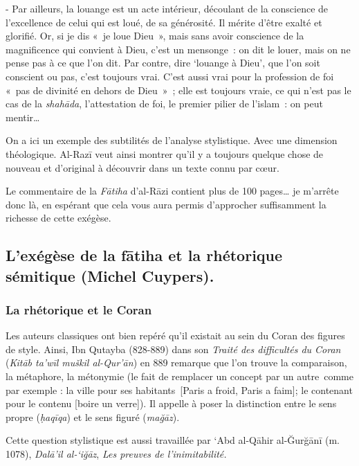 - Par ailleurs, la louange est un acte intérieur, découlant de la
conscience de l'excellence de celui qui est loué, de sa générosité. Il
mérite d'être exalté et glorifié. Or, si je dis «~je loue Dieu~», mais
sans avoir conscience de la magnificence qui convient à Dieu, c'est un
mensonge~: on dit le louer, mais on ne pense pas à ce que l'on dit. Par
contre, dire `louange à Dieu', que l'on soit conscient ou pas, c'est
toujours vrai. C'est aussi vrai pour la profession de foi «~pas de
divinité en dehors de Dieu~»~; elle est toujours vraie, ce qui n'est pas
le cas de la \emph{shahāda}, l'attestation de foi, le premier pilier de
l'islam~: on peut mentir\ldots{}

On a ici un exemple des subtilités de l'analyse stylistique. Avec une
dimension théologique. Al-Razī veut ainsi montrer qu'il y a toujours
quelque chose de nouveau et d'original à découvrir dans un texte connu
par cœur.

Le commentaire de la \emph{Fātiha} d'al-Rāzi contient plus de 100
pages\ldots{} je m'arrête donc là, en espérant que cela vous aura permis
d'approcher suffisamment la richesse de cette exégèse.


\subsection{L'exégèse de la fātiha et la rhétorique
sémitique (Michel Cuypers).
}


\subsubsection{La rhétorique et le Coran
}

Les auteurs classiques ont bien repéré qu'il existait au sein du Coran
des figures de style. Ainsi, Ibn Qutayba (828-889) dans son \emph{Traité
des difficultés du Coran} (\emph{Kitāb ta'wīl muškil al-Qur'ān}) en 889
remarque que l'on trouve la comparaison, la métaphore, la métonymie (le
fait de remplacer un concept par un autre~comme par exemple : la ville
pour ses habitants~{[}Paris a froid, Paris a faim{]}; le contenant pour
le contenu {[}boire un verre{]}). Il appelle à poser la distinction
entre le sens propre (\emph{ḥaqīqa}) et le sens figuré (\emph{mağāz}).

Cette question stylistique est aussi travaillée par `Abd al-Qāhir
al-Ğurğānī (m. 1078), \emph{Dalā'il al-`iğāz}, \emph{Les preuves de
l'inimitabilité.}~


